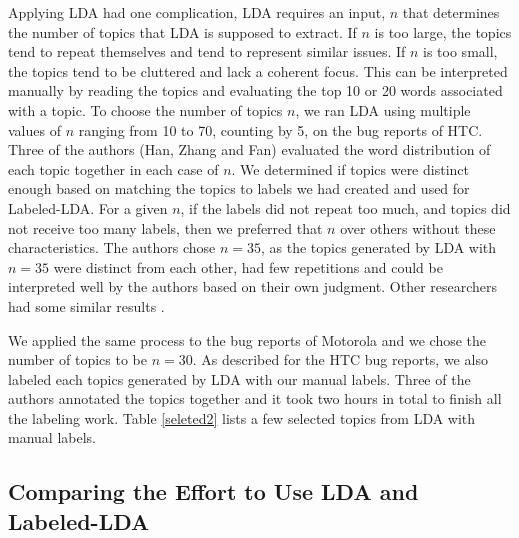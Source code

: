 \documentclass[10pt, conference, compsocconf]{IEEEtran}
\begin{document}
Applying LDA had one complication, LDA requires an input, $n$ that
determines the number of topics that LDA is supposed to extract. 
If $n$ is too large, the topics tend to repeat themselves and tend to
represent similar issues. 
If $n$ is too small, the topics tend to be cluttered and lack a
coherent focus.
This can be interpreted manually by reading the topics and evaluating
the top 10 or 20 words associated with a topic.
To choose the number of topics $n$, we ran LDA using multiple values
of $n$ ranging from 10 to 70, counting by 5,
on the bug reports of HTC. 
Three of the authors (Han, Zhang and Fan) evaluated the word distribution of each topic
together in each case of $n$. 
We determined if topics were distinct enough based on matching the
topics to labels we had created and used for Labeled-LDA. 
For a given $n$, if the labels did not repeat too much, and topics did not receive too
many labels, then we preferred that $n$ over others without these
characteristics.
The authors chose $n = 35$, as the topics generated by LDA with $n = 35$
were distinct from each other, had few repetitions and could be
interpreted well by the authors based on their own judgment.
Other researchers had some similar results
\cite{Thomas:2011,Hindle2011,Hindle}. 

We applied the same process to the bug reports of Motorola and we chose
the number of topics to be $n = 30$. 
As described for the HTC bug reports, we also labeled each topics
generated by LDA with our manual labels.
Three of the authors annotated the topics together and it took two
hours in total to finish all the labeling work. 
Table \ref{seleted2} lists a few selected topics from LDA with manual labels.


\subsection{Comparing the Effort to Use LDA and Labeled-LDA}

\end{document}
